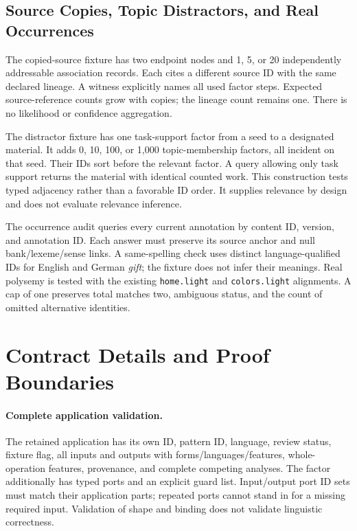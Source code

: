 \documentclass{article}
\begin{document}
\subsection{Source Copies, Topic Distractors, and Real Occurrences}

The copied-source fixture has two endpoint nodes and 1, 5, or 20 independently addressable association records. Each cites a different source ID with the same declared lineage. A witness explicitly names all used factor steps. Expected source-reference counts grow with copies; the lineage count remains one. There is no likelihood or confidence aggregation.

The distractor fixture has one task-support factor from a seed to a designated material. It adds 0, 10, 100, or 1,000 topic-membership factors, all incident on that seed. Their IDs sort before the relevant factor. A query allowing only task support returns the material with identical counted work. This construction tests typed adjacency rather than a favorable ID order. It supplies relevance by design and does not evaluate relevance inference.

The occurrence audit queries every current annotation by content ID, version, and annotation ID. Each answer must preserve its source anchor and null bank/lexeme/sense links. A same-spelling check uses distinct language-qualified IDs for English and German \emph{gift}; the fixture does not infer their meanings. Real polysemy is tested with the existing \texttt{home.light} and \texttt{colors.light} alignments. A cap of one preserves total matches two, ambiguous status, and the count of omitted alternative identities.

\section{Contract Details and Proof Boundaries}
\label{app:contracts}

\paragraph{Complete application validation.}
The retained application has its own ID, pattern ID, language, review status, fixture flag, all inputs and outputs with forms/languages/features, whole-operation features, provenance, and complete competing analyses. The factor additionally has typed ports and an explicit guard list. Input/output port ID sets must match their application parts; repeated ports cannot stand in for a missing required input. Validation of shape and binding does not validate linguistic correctness.
\end{document}
